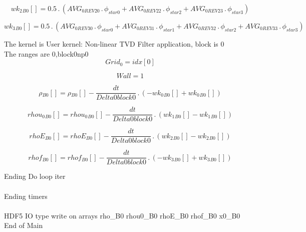 \documentclass{article}
\begin{document}
\begin{dmath}{wk_{2}{_{B0}}}[{}] = 0.5 \,.\, \left(AVG_{0 REV 20} \,.\, \phi_{star 0} + AVG_{0 REV 22} \,.\, \phi_{star 2} + AVG_{0 REV 23} \,.\, \phi_{star 3}\right)\end{dmath}

\begin{dmath}{wk_{3}{_{B0}}}[{}] = 0.5 \,.\, \left(AVG_{0 REV 30} \,.\, \phi_{star 0} + AVG_{0 REV 31} \,.\, \phi_{star 1} + AVG_{0 REV 32} \,.\, \phi_{star 2} + AVG_{0 REV 33} \,.\, \phi_{star 3}\right)\end{dmath}

\noindent The kernel is User kernel: Non-linear TVD Filter application, block is 0\\\noindent The ranges are 0,block0np0\\\begin{dmath}Grid_{0} = {idx}[{0}]\end{dmath}

\begin{dmath}Wall = 1\end{dmath}

\begin{dmath}{\rho{_{B0}}}[{}] = {\rho{_{B0}}}[{}] - \frac{dt}{Delta0block0} \,.\, \left(- {wk_{0}{_{B0}}}[{}] + {wk_{0}{_{B0}}}[{}]\right)\end{dmath}

\begin{dmath}{rhou_{0}{_{B0}}}[{}] = {rhou_{0}{_{B0}}}[{}] - \frac{dt}{Delta0block0} \,.\, \left({wk_{1}{_{B0}}}[{}] - {wk_{1}{_{B0}}}[{}]\right)\end{dmath}

\begin{dmath}{rhoE{_{B0}}}[{}] = {rhoE{_{B0}}}[{}] - \frac{dt}{Delta0block0} \,.\, \left({wk_{2}{_{B0}}}[{}] - {wk_{2}{_{B0}}}[{}]\right)\end{dmath}

\begin{dmath}{rhof{_{B0}}}[{}] = {rhof{_{B0}}}[{}] - \frac{dt}{Delta0block0} \,.\, \left(- {wk_{3}{_{B0}}}[{}] + {wk_{3}{_{B0}}}[{}]\right)\end{dmath}

\noindent Ending Do loop iter\\
\\\noindent Ending timers\\
\\\noindent HDF5 IO type write on arrays rho_B0 rhou0_B0 rhoE_B0 rhof_B0 x0_B0\\\noindent End of Main\\
\end{document}

